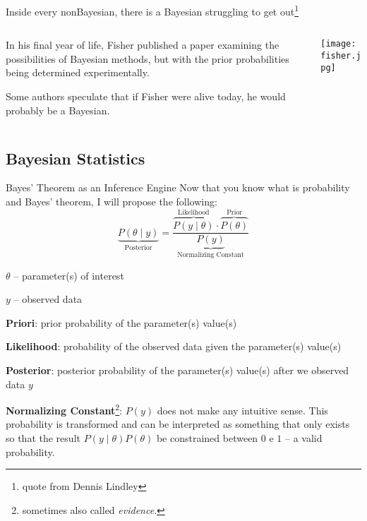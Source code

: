 \begin{frame}{Inside every nonBayesian, there is a Bayesian struggling to get out\footnote{
			quote from Dennis Lindley}}
	\begin{columns}
		\begin{column}{0.8\textwidth}
			\begin{vfilleditems}
				\item In his final year of life,
				Fisher published a paper \parencite{fisherExamplesBayesMethod1962}
				examining the possibilities of Bayesian methods,
				but with the prior probabilities being determined experimentally.
				\item Some authors speculate \parencite{jaynesProbabilityTheoryLogic2003}
				that if Fisher were alive today, he would probably be a Bayesian.
			\end{vfilleditems}
		\end{column}
		\begin{column}{0.2\textwidth}
			\centering
			\texttt{[image: fisher.jpg]}
		\end{column}
	\end{columns}
\end{frame}

\subsection{Bayesian Statistics}
\begin{frame}{Bayes' Theorem as an Inference Engine}
	\footnotesize Now that you know what is probability and Bayes' theorem,
	I will propose the following:
	$$
		\underbrace{P(\theta \mid y)}_{\text{Posterior}} = \frac{\overbrace{P(y \mid  \theta)}^{\text{Likelihood}} \cdot \overbrace{P(\theta)}^{\text{Prior}}}{\underbrace{P(y)}_{\text{Normalizing Constant}}}
	$$
	\begin{vfilleditems}
		\item \footnotesize $\theta$ -- parameter(s) of interest
		\item \footnotesize $y$ -- observed data
		\item \footnotesize \textbf{Priori}: prior probability of the parameter(s) value(s)
		\item \footnotesize \textbf{Likelihood}: probability of the observed data given the parameter(s) value(s)
		\item \footnotesize \textbf{Posterior}: posterior probability of the parameter(s) value(s) after we observed data $y$
		\item \footnotesize \textbf{Normalizing Constant}\footnote{sometimes also called \textit{evidence}.}: $P(y)$ does not make any intuitive sense.
		This probability is transformed and can be interpreted as something that only exists so that the result $P(y \mid \theta) P(\theta)$ be constrained between $0$ e $1$ -- a valid probability.
	\end{vfilleditems}
\end{frame}

